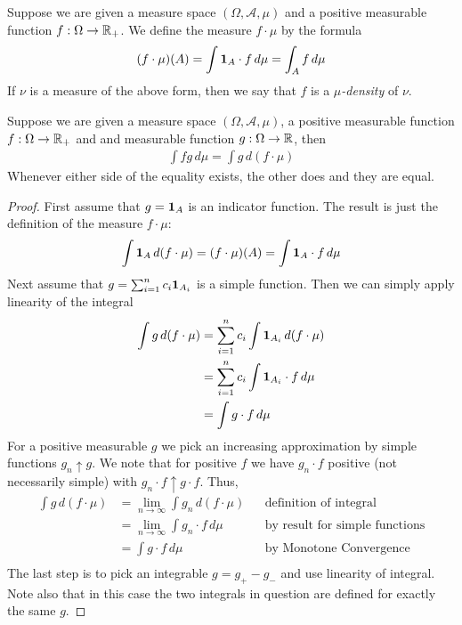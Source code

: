 \begin{defn}Suppose we are given a measure space $(\Omega, \mathcal{A},
  \mu)$ and a positive measurable function $f : \Omega \to \mathbb{R}_+$.
  We define the measure $f \cdot \mu$ by the formula
\begin{align*}
(f \cdot \mu)(A) = \int \textbf{1}_{A} \cdot f \, d \mu = \int_A f
\, d\mu
\end{align*}
If $\nu$ is a measure of the above form, then we say that $f$ is a
$\mu$\emph{-density} of $\nu$.
\end{defn}
\begin{lem}\label{ChainRuleDensity}Suppose we are given a measure space $(\Omega, \mathcal{A},
  \mu)$, a positive measurable function $f : \Omega \to \mathbb{R}_+$ and
  and measurable function $g : \Omega \to \mathbb{R}$, then 
\begin{align*}
\int f g \, d \mu = \int g \, d (f \cdot \mu)
\end{align*}
Whenever either side of the equality exists, the other does and they
are equal.
\end{lem}
\begin{proof}First assume that $g=\textbf{1}_{A}$ is an indicator
  function.  The result is just the definition of the measure $f \cdot
  \mu$:
\begin{align*}
\int \textbf{1}_{A} \, d(f \cdot \mu) = (f \cdot \mu)(A) = \int \textbf{1}_{A}
\cdot f \, d\mu
\end{align*}
Next assume that $g = \sum_{i=1}^n c_i \textbf{1}_{A_i}$ is a
simple function.  Then we can simply apply linearity of the integral
\begin{align*}
\int g \, d(f \cdot \mu) &=\sum_{i=1}^n c_i \int \textbf{1}_{A_i}
\, d(f \cdot \mu)\\
 &=\sum_{i=1}^n c_i \int \textbf{1}_{A_i}\cdot f
\, d\mu  \\
 &=\int g\cdot f
\, d\mu  \\
\end{align*}
For a positive measurable $g$ we pick an increasing approximation by simple
functions $g_n \uparrow g$.  We note that for positive $f$ we have 
 $g_n \cdot f$ positive (not necessarily simple) with $g_n \cdot f \uparrow g \cdot f$.  Thus,
\begin{align*}
\int g \, d(f \cdot \mu) &= \lim_{n \to \infty} \int g_n \, d(f \cdot
\mu) & &\text{definition of integral}\\
&= \lim_{n \to \infty} \int g_n \cdot f \, d \mu & &\text{by result for
  simple functions}\\
&= \int g \cdot f \, d \mu & &\text{by Monotone Convergence}\\
\end{align*}
The last step is to pick an integrable $g = g_+ - g_-$ and use
linearity of integral.  Note also that in this case the two integrals
in question are defined for exactly the same $g$.
\end{proof}

